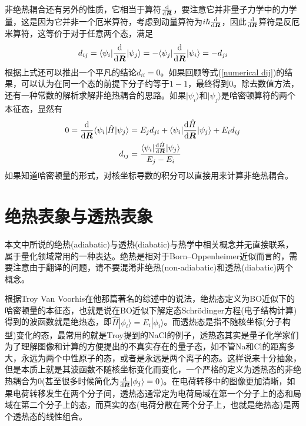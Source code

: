\documentclass[12pt,a4paper,openany,twoside]{book}
\numberwithin{equation}{section}
\newcommand{\sch}{Schr\"odinger}
\newcommand{\ud}{\mathrm{d}}
\begin{document}
        非绝热耦合还有另外的性质，它相当于算符$\frac{\ud }{\ud \vb*{R}}$，要注意它并非量子力学中的力学量，这是因为它并非一个厄米算符，考虑到动量算符为$i\hbar\frac{\ud }{\ud \vb*{R}}$，因此$\frac{\ud }{\ud \vb*{R}}$算符是反厄米算符，这等价于对于任意两个态，满足
        \begin{equation}
          d_{ij}=\langle\psi_i|\frac{\ud }{\ud \vb*{R}}|\psi_j\rangle=-\langle\psi_j|\frac{\ud }{\ud \vb*{R}}|\psi_i\rangle=-d_{ji}
          \label{dij=-dji}
        \end{equation}
        根据上式还可以推出一个平凡的结论$d_{ii}=0$。如果回顾等式(\ref{numerical dij})的结果，可以认为在同一个态的前提下分子约等于$1-1$，最终得到$0$。除去数值方法，还有一种常数的解析求解非绝热耦合的思路。如果$|\psi_i\rangle$和$|\psi_j\rangle$是哈密顿算符的两个本征态，显然有
        \begin{equation}
          \begin{aligned}
            0=\frac{\ud }{\ud \vb*{R}}\langle\psi_i|\hat{H}|\psi_j\rangle&=E_j d_{ji}+\langle\psi_i|\frac{\ud \hat{H}}{\ud \vb*{R}}|\psi_j\rangle+E_i d_{ij}\\
            d_{ij}&=\frac{\langle\psi_i|\frac{\ud \hat{H}}{\ud \vb*{R}}|\psi_j\rangle}{E_j-E_i}
          \end{aligned} 
          \label{analytical dij}
        \end{equation}
        如果知道哈密顿量的形式，对核坐标导数的积分可以直接用来计算非绝热耦合。
      \section{绝热表象与透热表象}
        本文中所说的绝热(adiabatic)与透热(diabatic)与热学中相关概念并无直接联系，属于量化领域常用的一种表达。绝热是相对于Born–Oppenheimer近似而言的，需要注意由于翻译的问题，请不要混淆非绝热(non-adiabatic)和透热(diabatic)两个概念。

        根据Troy Van Voorhis在他那篇著名的综述\cite{VanVoorhis2010}中的说法，绝热态定义为BO近似下的哈密顿量的本征态，也就是说在BO近似下解定态\sch 方程(电子结构计算)得到的波函数就是绝热态，即$\hat{H}|\phi_i\rangle=E_i|\phi_i\rangle$。而透热态是指不随核坐标(分子构型)变化的态，最常用的就是Troy提到的NaCl的例子，透热态其实是量子化学家们为了理解图像和计算的方便提出的不真实存在的量子态，如不管Na和Cl的距离多大，永远为两个中性原子的态，或者是永远是两个离子的态。这样说来十分抽象，但是本质上就是其波函数不随核坐标变化而变化，一个严格的定义为透热态的非绝热耦合为0(甚至很多时候简化为$\frac{\ud }{\ud \vb*{R}}|\phi_j\rangle=0$)。在电荷转移中的图像更加清晰，如果电荷转移发生在两个分子间，透热态通常定为电荷局域在第一个分子上的态和局域在第二个分子上的态，而真实的态(电荷分散在两个分子上，也就是绝热态)是两个透热态的线性组合。
\end{document}
